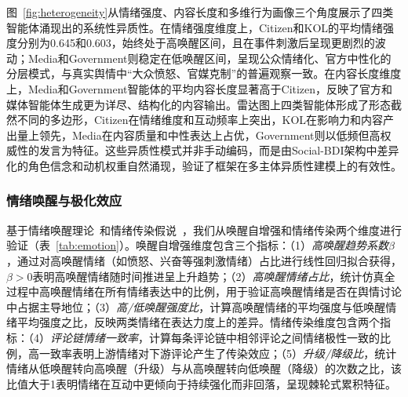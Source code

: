 \documentclass[a4paper,fleqn]{cas-dc}
\begin{document}
图~\ref{fig:heterogeneity}从情绪强度、内容长度和多维行为画像三个角度展示了四类智能体涌现出的系统性异质性。在情绪强度维度上，Citizen和KOL的平均情绪强度分别为0.645和0.603，始终处于高唤醒区间，且在事件刺激后呈现更剧烈的波动；Media和Government则稳定在低唤醒区间，呈现公众情绪化、官方中性化的分层模式，与真实舆情中“大众愤怒、官媒克制”的普遍观察一致。在内容长度维度上，Media和Government智能体的平均内容长度显著高于Citizen，反映了官方和媒体智能体生成更为详尽、结构化的内容输出。雷达图上四类智能体形成了形态截然不同的多边形，Citizen在情绪维度和互动频率上突出，KOL在影响力和内容产出量上领先，Media在内容质量和中性表达上占优，Government则以低频但高权威性的发言为特征。这些异质性模式并非手动编码，而是由Social-BDI架构中差异化的角色信念和动机权重自然涌现，验证了框架在多主体异质性建模上的有效性。

\subsubsection{情绪唤醒与极化效应}

基于情绪唤醒理论~\citep{berger_what_2012}和情绪传染假说~\citep{hatfield_emotional_1994}，我们从唤醒自增强和情绪传染两个维度进行验证（表~\ref{tab:emotion}）。唤醒自增强维度包含三个指标：（1）\textit{高唤醒趋势系数}$\beta$，通过对高唤醒情绪（如愤怒、兴奋等强刺激情绪）占比进行线性回归拟合获得，$\beta>0$表明高唤醒情绪随时间推进呈上升趋势；（2）\textit{高唤醒情绪占比}，统计仿真全过程中高唤醒情绪在所有情绪表达中的比例，用于验证高唤醒情绪是否在舆情讨论中占据主导地位；（3）\textit{高/低唤醒强度比}，计算高唤醒情绪的平均强度与低唤醒情绪平均强度之比，反映两类情绪在表达力度上的差异。情绪传染维度包含两个指标：（4）\textit{评论链情绪一致率}，计算每条评论链中相邻评论之间情绪极性一致的比例，高一致率表明上游情绪对下游评论产生了传染效应；（5）\textit{升级/降级比}，统计情绪从低唤醒转向高唤醒（升级）与从高唤醒转向低唤醒（降级）的次数之比，该比值大于1表明情绪在互动中更倾向于持续强化而非回落，呈现棘轮式累积特征。
\end{document}
